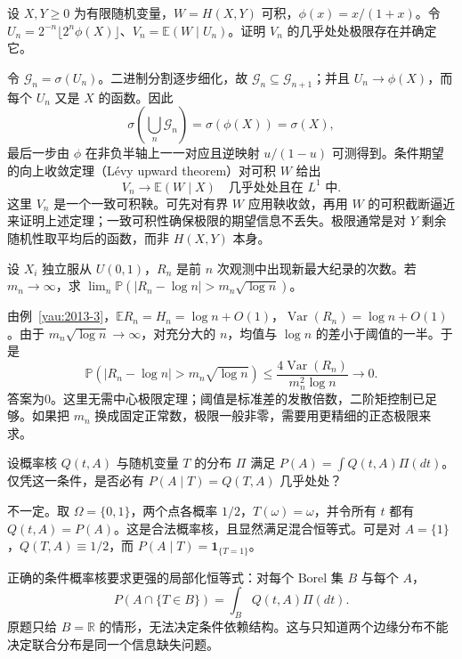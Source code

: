 \documentclass[UTF8,12pt,a4paper,fontset=fandol]{ctexbook}
\newcommand{\E}{\mathbb E}
\newcommand{\PP}{\mathbb P}
\DeclareMathOperator{\Var}{Var}
\begin{document}
\begin{example}[原题2：逐步精细的信息与条件期望极限]\label{yau:2023-2}
设 $X,Y\ge0$ 为有限随机变量，$W=H(X,Y)$ 可积，$\phi(x)=x/(1+x)$。令 $U_n=2^{-n}\lfloor2^n\phi(X)\rfloor$、$V_n=\E(W\mid U_n)$。证明 $V_n$ 的几乎处处极限存在并确定它。
\end{example}
\begin{solve}
令 $\mathcal G_n=\sigma(U_n)$。二进制分割逐步细化，故 $\mathcal G_n\subseteq\mathcal G_{n+1}$；并且 $U_n\to\phi(X)$，而每个 $U_n$ 又是 $X$ 的函数。因此
\[
\sigma\left(\bigcup_n\mathcal G_n\right)=\sigma(\phi(X))=\sigma(X),
\]
最后一步由 $\phi$ 在非负半轴上一一对应且逆映射 $u/(1-u)$ 可测得到。条件期望的向上收敛定理（Lévy upward theorem）对可积 $W$ 给出
\[
V_n\longrightarrow\E(W\mid X)\quad\text{几乎处处且在 }L^1\text{ 中}.
\]
这里 $V_n$ 是一个一致可积鞅。可先对有界 $W$ 应用鞅收敛，再用 $W$ 的可积截断逼近来证明上述定理；一致可积性确保极限的期望信息不丢失。极限通常是对 $Y$ 剩余随机性取平均后的函数，而非 $H(X,Y)$ 本身。
\end{solve}

\begin{example}[原题3：纪录数的宽于标准差的偏差]\label{yau:2023-3}
设 $X_i$ 独立服从 $U(0,1)$，$R_n$ 是前 $n$ 次观测中出现新最大纪录的次数。若 $m_n\to\infty$，求 $\lim_n\PP(|R_n-\log n|>m_n\sqrt{\log n})$。
\end{example}
\begin{solve}
由例~\ref{yau:2013-3}，$\E R_n=H_n=\log n+O(1)$，$\Var(R_n)=\log n+O(1)$。由于 $m_n\sqrt{\log n}\to\infty$，对充分大的 $n$，均值与 $\log n$ 的差小于阈值的一半。于是
\[
\PP(|R_n-\log n|>m_n\sqrt{\log n})\le\frac{4\Var(R_n)}{m_n^2\log n}\to0.
\]
答案为0。这里无需中心极限定理；阈值是标准差的发散倍数，二阶矩控制已足够。如果把 $m_n$ 换成固定正常数，极限一般非零，需要用更精细的正态极限来求。
\end{solve}

\begin{example}[原题4：混合表示是否就是条件概率]\label{yau:2023-4}
设概率核 $Q(t,A)$ 与随机变量 $T$ 的分布 $\Pi$ 满足 $P(A)=\int Q(t,A)\Pi(dt)$。仅凭这一条件，是否必有 $P(A\mid T)=Q(T,A)$ 几乎处处？
\end{example}
\begin{solve}
不一定。取 $\Omega=\{0,1\}$，两个点各概率 $1/2$，$T(\omega)=\omega$，并令所有 $t$ 都有 $Q(t,A)=P(A)$。这是合法概率核，且显然满足混合恒等式。可是对 $A=\{1\}$，$Q(T,A)\equiv1/2$，而 $P(A\mid T)=\mathbf1_{\{T=1\}}$。

正确的条件概率核要求更强的局部化恒等式：对每个 Borel 集 $B$ 与每个 $A$，
\[
P(A\cap\{T\in B\})=\int_BQ(t,A)\Pi(dt).
\]
原题只给 $B=\mathbb R$ 的情形，无法决定条件依赖结构。这与只知道两个边缘分布不能决定联合分布是同一个信息缺失问题。
\end{solve}
\end{document}
